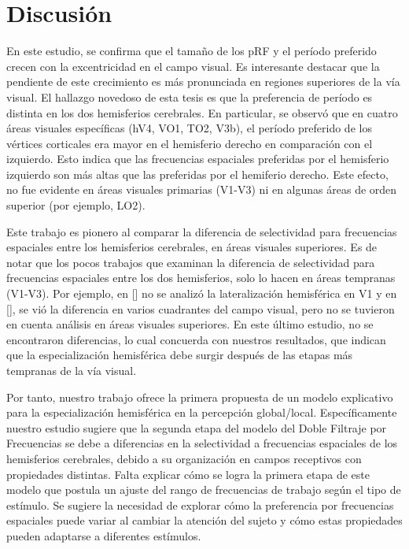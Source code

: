 \chapter{Discusi\'on}\label{chapter:discussion}

En este estudio, se confirma que el tamaño de los pRF y el período preferido crecen con la excentricidad en el campo visual. Es interesante destacar que la pendiente de este crecimiento es más pronunciada en regiones superiores de la vía visual. El hallazgo novedoso de esta tesis es que la preferencia de per\'iodo es distinta en los dos hemisferios cerebrales. En particular, se observó que en cuatro áreas visuales específicas (hV4, VO1, TO2, V3b), el período preferido de los vértices corticales era mayor en el hemisferio derecho en comparación con el izquierdo. Esto indica que las frecuencias espaciales preferidas por el hemisferio izquierdo son m\'as altas que las preferidas por el hemiferio derecho. Este efecto, no fue evidente en áreas visuales primarias (V1-V3) ni en algunas áreas de orden superior (por ejemplo, LO2).

Este trabajo es pionero al comparar la diferencia de selectividad para frecuencias espaciales entre los hemisferios cerebrales, en áreas visuales superiores. Es de notar que los pocos trabajos que examinan la diferencia de selectividad para frecuencias espaciales entre los dos hemisferios, solo lo hacen en áreas tempranas (V1-V3). Por ejemplo, en [\cite{broderick_mapping_2022}] no se analiz\'o la lateralizaci\'on hemisf\'erica en V1 y en [\cite{aghajari_population_2020}], se vi\'o la diferencia en varios cuadrantes del campo visual, pero  no se tuvieron en cuenta an\'alisis en \'areas visuales superiores. En este \'ultimo estudio, no se encontraron diferencias, lo cual concuerda con nuestros resultados, que indican que la especialización hemisf\'erica debe surgir después de las etapas más tempranas de la vía visual. 

Por tanto, nuestro trabajo ofrece la primera propuesta de un modelo explicativo para la especialización hemisférica en la percepción global/local. Específicamente nuestro estudio sugiere que la segunda etapa del modelo del Doble Filtraje por Frecuencias se debe a diferencias en la selectividad a frecuencias espaciales de los hemisferios cerebrales, debido a su organización en campos receptivos con propiedades distintas.  Falta explicar cómo se logra la primera etapa de este modelo que postula un ajuste del rango de frecuencias de trabajo según el tipo de estímulo. Se sugiere la necesidad de explorar cómo la preferencia por frecuencias espaciales puede variar al cambiar la atención del sujeto y cómo estas propiedades pueden adaptarse a diferentes estímulos.

